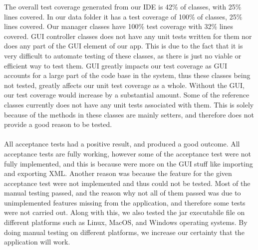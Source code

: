 The overall test coverage generated from our IDE is 42\% of classes, with 25\% lines covered. In our data folder it has a test coverage of 100\% of classes, 25\% lines covered. Our manager classes have 100\% test coverage with 32\% lines covered. GUI controller classes does not have any unit tests written for them nor does any part of the GUI element of our app. This is due to the fact that it is very difficult to automate testing of these classes, as there is just no viable or efficient way to test them. GUI greatly impacts our test coverage as GUI accounts for a large part of the code base in the system, thus these classes being not tested, greatly affects our unit test coverage as a whole. Without the GUI, our test coverage would increase by a substantial amount. Some of the reference classes currently does not have any unit tests associated with them. This is solely because of the methods in these classes are mainly setters, and therefore does not provide a good reason to be tested. \\ \\All acceptance tests had a positive result, and produced a good outcome. All acceptance tests are fully working, however some of the acceptance test were not fully implemented, and this is because were more on the GUI stuff like importing and exporting XML. Another reason was because the feature for the given acceptance test were not implemented and thus could not be tested. Most of the manual testing passed, and the reason why not all of them passed was due to unimplemented features missing from the application, and therefore some tests were not carried out. Along with this, we also tested the jar executabile file on different platforms such as Linux, MacOS, and Windows operating systems. By doing manual testing on different platforms, we increase our certainty that the application will work.\\